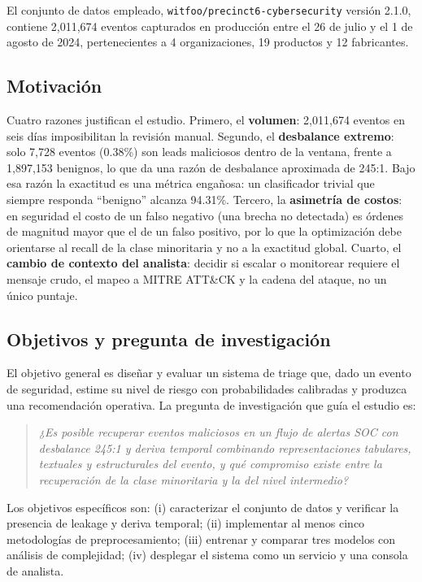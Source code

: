 \documentclass[conference]{IEEEtran}
\begin{document}
El conjunto de datos empleado, \texttt{witfoo/precinct6-cybersecurity} versión 2.1.0, contiene 2,011,674 eventos capturados en producci\'on entre el 26 de julio y el 1 de agosto de 2024, pertenecientes a 4 organizaciones, 19 productos y 12 fabricantes.

\subsection{Motivaci\'on}
Cuatro razones justifican el estudio. Primero, el \textbf{volumen}: 2,011,674 eventos en seis d\'ias imposibilitan la revisi\'on manual. Segundo, el \textbf{desbalance extremo}: solo 7,728 eventos (0.38\%) son leads maliciosos dentro de la ventana, frente a 1,897,153 benignos, lo que da una raz\'on de desbalance aproximada de 245:1. Bajo esa raz\'on la exactitud es una m\'etrica enga\~nosa: un clasificador trivial que siempre responda ``benigno'' alcanza 94.31\%. Tercero, la \textbf{asimetr\'ia de costos}: en seguridad el costo de un falso negativo (una brecha no detectada) es \'ordenes de magnitud mayor que el de un falso positivo, por lo que la optimizaci\'on debe orientarse al recall de la clase minoritaria y no a la exactitud global. Cuarto, el \textbf{cambio de contexto del analista}: decidir si escalar o monitorear requiere el mensaje crudo, el mapeo a MITRE ATT\&CK y la cadena del ataque, no un \'unico puntaje.

\subsection{Objetivos y pregunta de investigaci\'on}
El objetivo general es dise\~nar y evaluar un sistema de triage que, dado un evento de seguridad, estime su nivel de riesgo con probabilidades calibradas y produzca una recomendaci\'on operativa. La pregunta de investigaci\'on que gu\'ia el estudio es:

\begin{quote}
\textit{¿Es posible recuperar eventos maliciosos en un flujo de alertas SOC con desbalance 245:1 y deriva temporal combinando representaciones tabulares, textuales y estructurales del evento, y qu\'e compromiso existe entre la recuperaci\'on de la clase minoritaria y la del nivel intermedio?}
\end{quote}

Los objetivos espec\'ificos son: (i) caracterizar el conjunto de datos y verificar la presencia de leakage y deriva temporal; (ii) implementar al menos cinco metodolog\'ias de preprocesamiento; (iii) entrenar y comparar tres modelos con an\'alisis de complejidad; (iv) desplegar el sistema como un servicio y una consola de analista.
\end{document}
